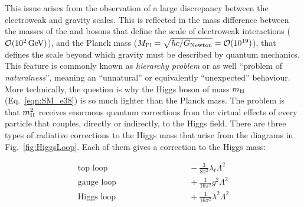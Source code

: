 This issue arises from the observation of a large discrepancy between the electroweak and gravity scales. This is reflected in the mass difference between the masses of the \PW and \PZ bosons that define the scale of electroweak interactions ($\mathcal{O}(10^2\,\text{Ge\hspace{-.08em}V})$), and the Planck mass ($M_\mathrm{Pl} = \sqrt{\hbar c/G_\mathrm{Newton}} = \mathcal{O}(10^{19})$), that defines the scale beyond which gravity must be described by quantum mechanics. This feature is commonly known as \textit{hierarchy problem} or as well ``problem of \textit{naturalness}'', meaning an ``unnatural'' or equivalently ``unexpected'' behaviour.
More technically, the question is why the Higgs boson of mass $m_\mathrm{H}$ (Eq.~\ref{eqn:SM_e38}) is so much lighter than the Planck mass.
The problem is that $m^2_\mathrm{H}$ receives enormous quantum corrections from the virtual effects of every particle that couples, directly or indirectly, to the Higgs field.
There are three types of radiative corrections to the Higgs mass that arise from the diagrams in Fig.~\ref{fig:HiggsLoop}.
Each of them gives a correction to the Higgs mass:

\begin{equation}\label{eqn:HiggsCorr}
\begin{aligned}
\mbox{top loop} & \qquad\qquad\qquad\qquad -\frac{3}{8\pi^2}\lambda_t\Lambda^2\\
\mbox{gauge loop} & \qquad\qquad\qquad\qquad + \frac{1}{16\pi^2}g^2\Lambda^2\\
\mbox{Higgs loop} & \qquad\qquad\qquad\qquad + \frac{1}{16\pi^2}\lambda^2\Lambda^2\\
\end{aligned}
\end{equation}

